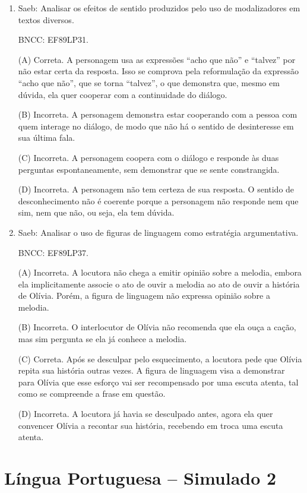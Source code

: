 \begin{enumerate}
\item

Saeb: Analisar os efeitos de sentido produzidos pelo uso de
modalizadores em textos diversos.

BNCC: EF89LP31.

(A) Correta. A personagem usa as expressões ``acho que não'' e
``talvez'' por não estar certa da resposta. Isso se comprova pela
reformulação da expressão ``acho que não'', que se torna ``talvez'', o
que demonstra que, mesmo em dúvida, ela quer cooperar com a continuidade
do diálogo.

(B) Incorreta. A personagem demonstra estar cooperando com a pessoa com quem interage no diálogo, de modo que não há o sentido de desinteresse
em sua última fala.

(C) Incorreta. A personagem coopera com o diálogo e responde às duas
perguntas espontaneamente, sem demonstrar que se sente constrangida.

(D) Incorreta. A personagem não tem certeza de sua resposta. O sentido
de desconhecimento não é coerente porque a personagem não responde nem
que sim, nem que não, ou seja, ela tem dúvida.


\item

Saeb: Analisar o uso de figuras de linguagem como estratégia
argumentativa.

BNCC: EF89LP37.

(A) Incorreta. A locutora não chega a emitir opinião sobre a melodia,
embora ela implicitamente associe o ato de ouvir a melodia ao ato de
ouvir a história de Olívia. Porém, a figura de linguagem não expressa
opinião sobre a melodia.

(B) Incorreta. O interlocutor de Olívia não recomenda que ela ouça a cação, mas sim pergunta se ela já conhece a melodia.

(C) Correta. Após se desculpar pelo esquecimento, a locutora pede que
Olívia repita sua história outras vezes. A figura de linguagem visa a
demonstrar para Olívia que esse esforço vai ser recompensado por uma
escuta atenta, tal como se compreende a frase em questão.

(D) Incorreta. A locutora já havia se desculpado antes, agora ela quer
convencer Olívia a recontar sua história, recebendo em troca uma escuta
atenta.
\end{enumerate}

\section*{Língua Portuguesa – Simulado 2}

